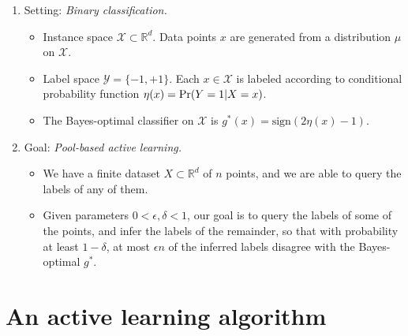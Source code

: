 \documentclass{article}
\def\R{{\mathbb{R}}}
\def\pr{{\rm Pr}}
\def\X{{\mathcal X}}
\def\Y{{\mathcal Y}}
\begin{document}
\begin{enumerate}
\item Setting: {\it Binary classification.}

\begin{itemize}
\item Instance space $\X \subset \R^d$. Data points $x$ are generated from a distribution $\mu$ on $\X$.
\item Label space $\Y = \{-1,+1\}$. Each $x \in \X$ is labeled according to conditional probability function $\eta(x) = \pr(Y=1|X=x)$.
\item The Bayes-optimal classifier on $\X$ is $g^*(x) = \mbox{sign}(2 \eta(x) - 1)$.
\end{itemize}

\item Goal: {\it Pool-based active learning.}

\begin{itemize}
\item We have a finite dataset $X \subset \R^d$ of $n$ points, and we are able to query the labels of any of them.
\item Given parameters $0 < \epsilon, \delta < 1$, our goal is to query the labels of some of the points, and infer the labels of the remainder, so that with probability at least $1-\delta$, at most $\epsilon n$ of the inferred labels disagree with the Bayes-optimal $g^*$.
\end{itemize}

\end{enumerate}


\section{An active learning algorithm}
\end{document}
